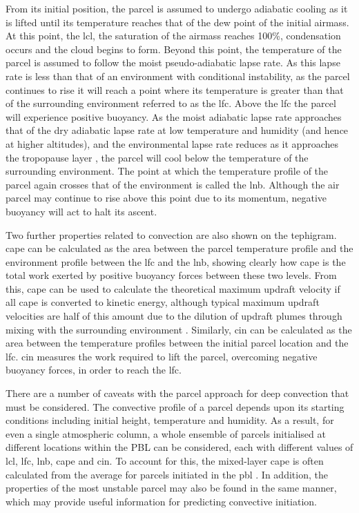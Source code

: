 From its initial position, the parcel is assumed to undergo adiabatic cooling as it is lifted until its temperature reaches that of the dew point of the initial airmass. 
At this point, the \acrshort{lcl}, the saturation of the airmass reaches 100\%, condensation occurs and the cloud begins to form. 
Beyond this point, the temperature of the parcel is assumed to follow the moist pseudo-adiabatic lapse rate. 
As this lapse rate is less than that of an environment with conditional instability, as the parcel continues to rise it will reach a point where its temperature is greater than that of the surrounding environment referred to as the \acrshort{lfc}. 
Above the \acrshort{lfc} the parcel will experience positive buoyancy. 
As the moist adiabatic lapse rate approaches that of the dry adiabatic lapse rate at low temperature and humidity (and hence at higher altitudes), and the environmental lapse rate reduces as it approaches the tropopause layer \citep{fueglistaler_tropical_2009}, the parcel will cool below the temperature of the surrounding environment. 
The point at which the temperature profile of the parcel again crosses that of the environment is called the \acrfull{lnb}. 
Although the air parcel may continue to rise above this point due to its momentum, negative buoyancy will act to halt its ascent.

Two further properties related to convection are also shown on the tephigram. 
\acrshort{cape} can be calculated as the area between the parcel temperature profile and the environment profile between the \acrshort{lfc} and the \acrshort{lnb}, showing clearly how \acrshort{cape} is the total work exerted by positive buoyancy forces between these two levels. 
From this, \acrshort{cape} can be used to calculate the theoretical maximum updraft velocity if all \acrshort{cape} is converted to kinetic energy, although typical maximum updraft velocities are half of this amount due to the dilution of updraft plumes through mixing with the surrounding environment \citep{lemone_cumulonimbus_1980, romps_undiluted_2010}. 
Similarly, \acrfull{cin} can be calculated as the area between the temperature profiles between the initial parcel location and the \acrshort{lfc}. 
\acrshort{cin} measures the work required to lift the parcel, overcoming negative buoyancy forces, in order to reach the \acrshort{lfc}.

There are a number of caveats with the parcel approach for deep convection that must be considered. 
The convective profile of a parcel depends upon its starting conditions including initial height, temperature and humidity. 
As a result, for even a single atmospheric column, a whole ensemble of parcels initialised at different locations within the PBL can be considered, each with different values of \acrshort{lcl}, \acrshort{lfc}, \acrshort{lnb}, \acrshort{cape} and \acrshort{cin}. 
To account for this, the mixed-layer \acrshort{cape} is often calculated from the average for parcels initiated in the \acrshort{pbl} \citep{stevens_atmospheric_2005}. 
In addition, the properties of the most unstable parcel may also be found in the same manner, which may provide useful information for predicting convective initiation.

